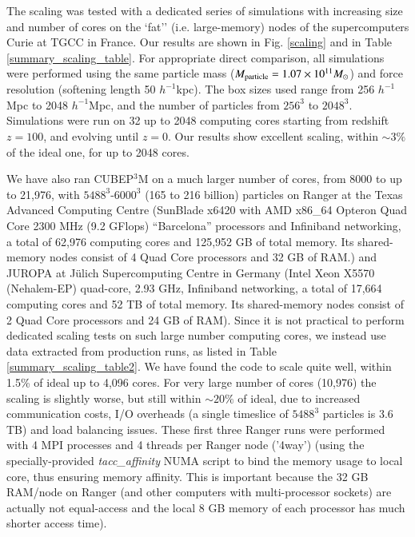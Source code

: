  
The scaling was tested with a dedicated series 
of simulations with increasing size and number of cores on the `fat'' 
(i.e. large-memory) nodes of the supercomputers Curie at TGCC in France. 
Our results are shown in Fig. \ref{scaling} and in 
Table \ref{summary_scaling_table}. For appropriate direct comparison,
all simulations were performed using the same particle mass 
($M_{\rm particle}=1.07\times10^{11}M_\odot$) and force resolution 
(softening length 50 $h^{-1}$kpc). The box sizes used range from 256 $h^{-1}$Mpc
to 2048 $h^{-1}$Mpc, and the number of particles from $256^3$ to $2048^3$.
Simulations were run on 32 up to 2048 computing cores starting from 
redshift $z=100$, and evolving until $z=0$. Our results show excellent scaling, within 
$\sim3\%$ of the ideal one, for up to 2048 cores. 

We have also ran {\small CUBEP$^3$M} on a much larger number of cores, 
from 8000 to up to 21,976, with $5488^3$-$6000^3$ (165 to 216 billion) 
particles on Ranger at the Texas Advanced Computing Centre (SunBlade 
x6420 with AMD x86\_64 Opteron Quad Core 2300 MHz (9.2 GFlops)
``Barcelona'' processors and Infiniband networking, a total of 62,976 
computing cores and 125,952 GB of total memory. Its shared-memory nodes 
consist of 4 Quad Core processors and 32 GB of RAM.) and JUROPA 
at J\"ulich Supercomputing Centre in Germany (Intel Xeon X5570 
(Nehalem-EP) quad-core, 2.93 GHz, Infiniband networking, a total of 17,664
computing cores and 52 TB of total memory. Its shared-memory nodes 
consist of 2 Quad Core processors and 24 GB of RAM). Since it is not 
practical to perform dedicated scaling tests on such large number 
computing cores, we instead use data extracted from production runs, 
as listed in Table \ref{summary_scaling_table2}. We have found the 
code to scale quite well, within 1.5\% of ideal up to 4,096 cores. 
For very large number of cores (10,976) the scaling is slightly worse,
but still within $\sim20\%$ of ideal, due to increased communication 
costs, I/O overheads (a single timeslice of $5488^3$ particles is 3.6 TB)
and load balancing issues. These first three Ranger runs were performed 
with 4 MPI processes and 4 threads per Ranger node ('4way') (using the 
specially-provided {\it tacc\_affinity} NUMA script to bind the memory 
usage to local core, thus ensuring memory affinity. This is important 
because the 32 GB RAM/node on Ranger (and other computers with 
multi-processor sockets) are actually not equal-access and the local 
8 GB memory of each processor has much shorter access time).

